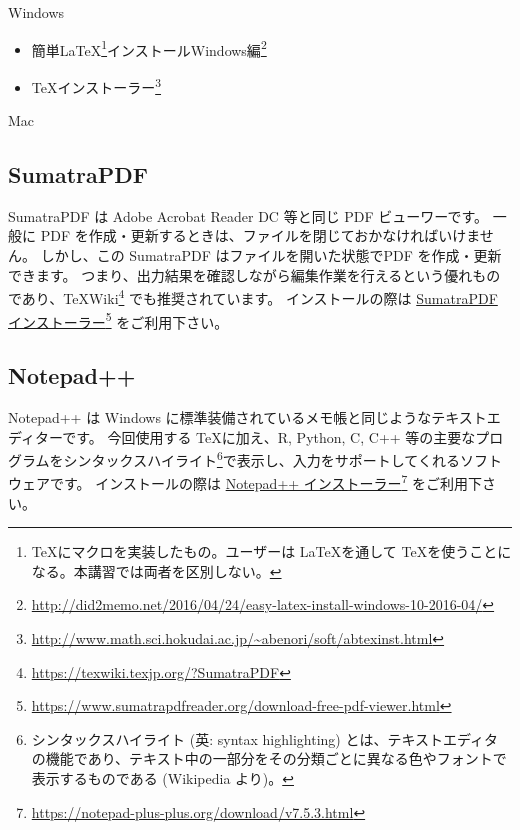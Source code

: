 \noindent Windows

\begin{itemize}
\item 簡単\LaTeX\footnote{\TeX にマクロを実装したもの。ユーザーは \LaTeX を通して \TeX を使うことになる。本講習では両者を区別しない。}インストールWindows編\footnote{\url{http://did2memo.net/2016/04/24/easy-latex-install-windows-10-2016-04/}}
\item \TeX インストーラー\footnote{\url{http://www.math.sci.hokudai.ac.jp/~abenori/soft/abtexinst.html}}
\end{itemize}



\noindent Mac




\subsection*{SumatraPDF}
SumatraPDF は Adobe Acrobat Reader DC 等と同じ PDF ビューワーです。
一般に PDF を作成・更新するときは、ファイルを閉じておかなければいけません。
しかし、この SumatraPDF はファイルを開いた状態でPDF を作成・更新できます。
つまり、出力結果を確認しながら編集作業を行えるという優れものであり、\TeX Wiki\footnote{\url{https://texwiki.texjp.org/?SumatraPDF}} でも推奨されています。
インストールの際は \href{https://www.sumatrapdfreader.org/download-free-pdf-viewer.html}{SumatraPDF インストーラー}\footnote{\url{https://www.sumatrapdfreader.org/download-free-pdf-viewer.html}} をご利用下さい。





\subsection*{Notepad++}
Notepad++ は Windows に標準装備されているメモ帳と同じようなテキストエディターです。
今回使用する \TeX に加え、R, Python, C, C++ 等の主要なプログラムをシンタックスハイライト\footnote{シンタックスハイライト (英: syntax highlighting) とは、テキストエディタの機能であり、テキスト中の一部分をその分類ごとに異なる色やフォントで表示するものである (Wikipedia より)。}で表示し、入力をサポートしてくれるソフトウェアです。
インストールの際は \href{https://notepad-plus-plus.org/download/v7.5.3.html}{Notepad++ インストーラー}\footnote{\url{https://notepad-plus-plus.org/download/v7.5.3.html}} をご利用下さい。






